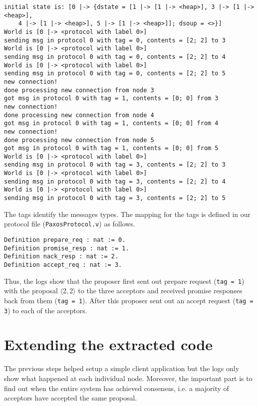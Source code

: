 \begin{lstlisting}
initial state is: [0 |-> {dstate = [1 |-> [1 |-> <heap>], 3 |-> [1 |-> <heap>],
    4 |-> [1 |-> <heap>], 5 |-> [1 |-> <heap>]]; dsoup = <>}]
World is [0 |-> <protocol with label 0>]
sending msg in protocol 0 with tag = 0, contents = [2; 2] to 3
World is [0 |-> <protocol with label 0>]
sending msg in protocol 0 with tag = 0, contents = [2; 2] to 4
World is [0 |-> <protocol with label 0>]
sending msg in protocol 0 with tag = 0, contents = [2; 2] to 5
new connection!
done processing new connection from node 3
got msg in protocol 0 with tag = 1, contents = [0; 0] from 3
new connection!
done processing new connection from node 4
got msg in protocol 0 with tag = 1, contents = [0; 0] from 4
new connection!
done processing new connection from node 5
got msg in protocol 0 with tag = 1, contents = [0; 0] from 5
World is [0 |-> <protocol with label 0>]
sending msg in protocol 0 with tag = 3, contents = [2; 2] to 3
World is [0 |-> <protocol with label 0>]
sending msg in protocol 0 with tag = 3, contents = [2; 2] to 4
World is [0 |-> <protocol with label 0>]
sending msg in protocol 0 with tag = 3, contents = [2; 2] to 5
\end{lstlisting}

The tags identify the messages types. The mapping for the tags is defined in
our protocol file (\texttt{PaxosProtocol.v}) as follows.

\begin{lstlisting}
Definition prepare_req : nat := 0.
Definition promise_resp : nat := 1.
Definition nack_resp : nat := 2.
Definition accept_req : nat := 3.
\end{lstlisting}

Thus, the logs show that the proposer first sent out prepare request
(\texttt{tag = 1}) with the proposal $\langle 2, 2 \rangle$
to the three acceptors and received promise responses back from them (\texttt{tag = 1}).
After this proposer sent out an accept request (\texttt{tag = 3}) to each of
the acceptors.

\section{Extending the extracted code}
The previous steps helped setup a simple client application but the logs
only show what happened at each individual node. Moreover, the important part is
to find out when the entire system has achieved consensus, i.e. a majority of
acceptors have accepted the same proposal.


